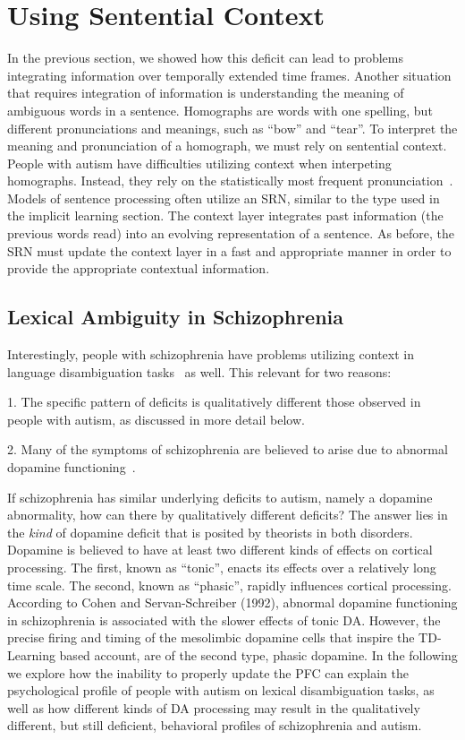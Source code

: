 %
%

\section{Using Sentential Context}
In the previous section, we showed how this deficit can lead to problems integrating information over temporally extended time frames.  Another situation that requires integration of information is understanding the meaning of ambiguous words in a sentence.  Homographs are words with one spelling, but different pronunciations and meanings, such as ``bow'' and ``tear''.  To interpret the meaning and pronunciation of a homograph, we must rely on sentential context. People with autism have difficulties utilizing context when interpeting homographs.  Instead, they rely on the statistically most frequent pronunciation~\cite{HappeF:1997:WCC_Homographs}.  Models of sentence processing often utilize an SRN, similar to the type used in the implicit learning section. The context layer integrates past information (the previous words read) into an evolving representation of a sentence.  As before, the SRN must update the context layer in a fast and appropriate manner in order to provide the appropriate contextual information.  

\subsection{Lexical Ambiguity in Schizophrenia}
Interestingly, people with schizophrenia have problems utilizing context in language disambiguation tasks~\cite{CohenJD:1992:Schizophrenia} as well.  This relevant for two reasons:

1.  The specific pattern of deficits is qualitatively different those observed in people with autism, as discussed in more detail below.

2.  Many of the symptoms of schizophrenia are believed to arise due to abnormal dopamine functioning~\cite{CohenJD:1992:Schizophrenia}.  

If schizophrenia has similar underlying deficits to autism, namely a dopamine abnormality, how can there by qualitatively different deficits?  The answer lies in the \emph{kind} of dopamine deficit that is posited by theorists in both disorders.  Dopamine is believed to have at least two different kinds of effects on cortical processing.  The first, known as ``tonic'', enacts its effects over a relatively long time scale.  The second, known as ``phasic'', rapidly influences cortical processing.  According to Cohen and Servan-Schreiber (1992), abnormal dopamine functioning in schizophrenia is associated with the slower effects of tonic DA.  However, the precise firing and timing of the mesolimbic dopamine cells that inspire the TD-Learning based account, are of the second type, phasic dopamine.  In the following we explore how the inability to properly update the PFC can explain the psychological profile of people with autism on lexical disambiguation tasks, as well as how different kinds of DA processing may result in the qualitatively different, but still deficient, behavioral profiles of schizophrenia and autism. 

